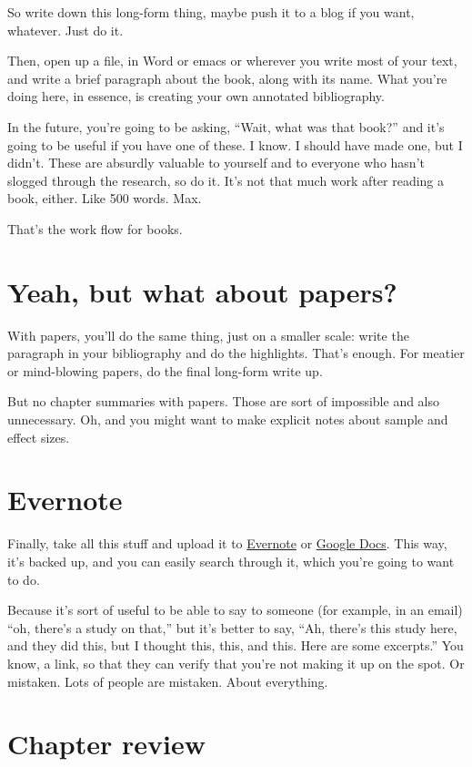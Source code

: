 So write down this long-form thing, maybe push it to a blog if you want,
whatever. Just do it.

Then, open up a file, in Word or emacs or wherever you write most of your text,
and write a brief paragraph about the book, along with its name. What you're
doing here, in essence, is creating your own annotated bibliography.

In the future, you're going to be asking, ``Wait, what was that book?'' and it's
going to be useful if you have one of these. I know. I should have made one, but
I didn't. These are absurdly valuable to yourself and to everyone who hasn't
slogged through the research, so do it. It's not that much work after reading a
book, either. Like 500 words. Max.

That's the work flow for books.

\section{Yeah, but what about papers?}

With papers, you'll do the same thing, just on a smaller scale: write the
paragraph in your bibliography and do the highlights. That's enough. For meatier or mind-blowing papers, do the final long-form write up.

But no chapter summaries with papers. Those are sort of impossible and also
unnecessary. Oh, and you might want to make explicit notes about sample and
effect sizes.

\section{Evernote}

Finally, take all this stuff and upload it to \href{https://evernote.com/}{Evernote} or \href{http://docs.google.com}{Google Docs}. This way,
it's backed up, and you can easily search through it, which you're going to want
to do.

Because it's sort of useful to be able to say to someone (for example, in an email)
``oh, there's a study on that,'' but it's better to say, ``Ah,
there's this study here, and they did this, but I thought this, this, and
this. Here are some excerpts.'' You know, a link, so that they can verify that you're not making it up
on the spot. Or mistaken. Lots of people are mistaken. About everything.


\section{Chapter review}

